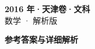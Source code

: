 \documentclass[zihao=-4, a4paper]{ctexart}
\begin{document}
\begin{center}
  {\Large\bfseries 2016 年·天津卷·文科}\\[4pt]
  {\large 数学 · 解析版}
\end{center}
\medskip
{}

\clearpage
{}
\begin{center}{\Large\bfseries 参考答案与详细解析}\end{center}
\medskip

\end{document}
